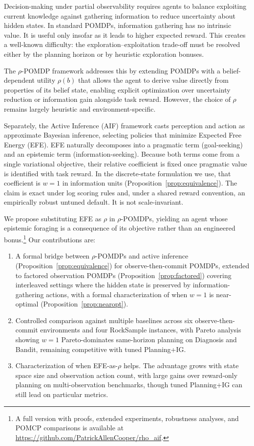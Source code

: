 \documentclass[runningheads]{llncs}
\begin{document}
Decision-making under partial observability requires agents to balance exploiting current knowledge against gathering information to reduce uncertainty about hidden states. In standard POMDPs, information gathering has no intrinsic value. It is useful only insofar as it leads to higher expected reward. This creates a well-known difficulty: the exploration--exploitation trade-off must be resolved either by the planning horizon or by heuristic exploration bonuses.

The $\rho$-POMDP framework \citep{araya2010} addresses this by extending POMDPs with a belief-dependent utility $\rho(b)$ that allows the agent to derive value directly from properties of its belief state, enabling explicit optimization over uncertainty reduction or information gain alongside task reward. However, the choice of $\rho$ remains largely heuristic and environment-specific.

Separately, the Active Inference (AIF) framework \citep{friston2010, parr2019} casts perception and action as approximate Bayesian inference, selecting policies that minimize Expected Free Energy (EFE). EFE naturally decomposes into a pragmatic term (goal-seeking) and an epistemic term (information-seeking). Because both terms come from a single variational objective, their relative coefficient is fixed once pragmatic value is identified with task reward. In the discrete-state formulation we use, that coefficient is $w{=}1$ in information units (Proposition~\ref{prop:equivalence}). The claim is exact under log scoring rules \citep{bernardo1979} and, under a shared reward convention, an empirically robust untuned default. It is not scale-invariant.

We propose substituting EFE as $\rho$ in $\rho$-POMDPs, yielding an agent whose epistemic foraging is a consequence of its objective rather than an engineered bonus.\footnote{A full version with proofs, extended experiments, robustness analyses, and POMCP comparisons is available at \url{https://github.com/PatrickAllenCooper/rho_aif}.} Our contributions are:
\begin{enumerate}
    \item A formal bridge between $\rho$-POMDPs and active inference (Proposition~\ref{prop:equivalence}) for observe-then-commit POMDPs, extended to factored observation POMDPs (Proposition~\ref{prop:factored}) covering interleaved settings where the hidden state is preserved by information-gathering actions, with a formal characterization of when $w{=}1$ is near-optimal (Proposition~\ref{prop:nearopt}).
    \item Controlled comparison against multiple baselines across six observe-then-commit environments and four RockSample instances, with Pareto analysis showing $w{=}1$ Pareto-dominates same-horizon planning on Diagnosis and Bandit, remaining competitive with tuned Planning+IG.
    \item Characterization of when EFE-as-$\rho$ helps. The advantage grows with state space size and observation action count, with large gains over reward-only planning on multi-observation benchmarks, though tuned Planning+IG can still lead on particular metrics.
\end{enumerate}
\end{document}
